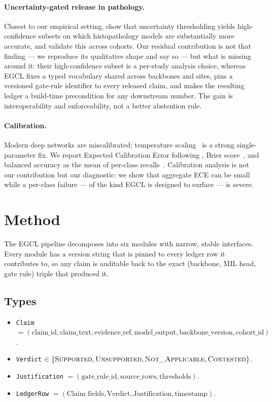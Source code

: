 \documentclass{article}
\begin{document}
\paragraph{Uncertainty-gated release in pathology.} Closest to our empirical setting, \citet{dolezal2022uncertainty} show that uncertainty thresholding yields high-confidence subsets on which histopathology models are substantially more accurate, and validate this across cohorts. Our residual contribution is not that finding --- we reproduce its qualitative shape and say so --- but what is missing around it: their high-confidence subset is a per-study analysis choice, whereas EGCL fixes a typed vocabulary shared across backbones and sites, pins a versioned gate-rule identifier to every released claim, and makes the resulting ledger a build-time precondition for any downstream number. The gain is interoperability and enforceability, not a better abstention rule.

\paragraph{Calibration.} Modern deep networks are miscalibrated; temperature scaling~\citep{guo2017calibration} is a strong single-parameter fix. We report Expected Calibration Error following \citet{naeini2015ece}, Brier score~\citep{brier1950verification}, and balanced accuracy as the mean of per-class recalls~\citep{brodersen2010balanced}. Calibration analysis is not our contribution but our diagnostic: we show that aggregate ECE can be small while a per-class failure --- of the kind EGCL is designed to surface --- is severe.

\section{Method}
\label{sec:method}

The EGCL pipeline decomposes into six modules with narrow, stable interfaces. Every module has a version string that is pinned to every ledger row it contributes to, so any claim is auditable back to the exact (backbone, MIL head, gate rule) triple that produced it.

\subsection{Types}
\label{sec:types}

\begin{itemize}
    \item \texttt{Claim} $= (\text{claim\_id}, \text{claim\_text}, \text{evidence\_ref}, \text{model\_output},\allowbreak \text{backbone\_version}, \text{cohort\_id})$.
    \item \texttt{Verdict} $\in \{\textsc{Supported}, \textsc{Unsupported}, \textsc{Not\_Applicable}, \textsc{Contested}\}$.
    \item \texttt{Justification} $= (\text{gate\_rule\_id}, \text{source\_rows}, \text{thresholds})$.
    \item \texttt{LedgerRow} $= (\text{Claim fields}, \text{Verdict}, \text{Justification}, \text{timestamp})$.
\end{itemize}
\end{document}
